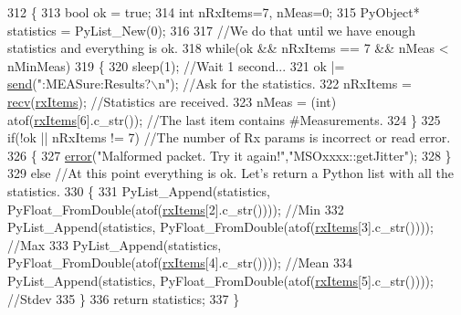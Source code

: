 \begin{DoxyCode}
312 \{   
313     \textcolor{keywordtype}{bool}            ok = \textcolor{keyword}{true};
314     \textcolor{keywordtype}{int}             nRxItems=7, nMeas=0;
315     PyObject* statistics = PyList\_New(0);
316 
317     \textcolor{comment}{//We do that until we have enough statistics and everything is ok.}
318     \textcolor{keywordflow}{while}(ok && nRxItems == 7 && nMeas < nMinMeas)
319     \{
320         sleep(1);                                                                   \textcolor{comment}{//Wait 1 second...}
321         ok |= \hyperlink{classMSOxxxx_ae77668a1ae4ccb74e0ed5f2485dfdebf}{send}(\textcolor{stringliteral}{":MEASure:Results?\(\backslash\)n"});              \textcolor{comment}{//Ask for the statistics.}
322         nRxItems = \hyperlink{classMSOxxxx_aa02e46a61e287ef1f5377e9e42399faf}{recv}(\hyperlink{classMSOxxxx_a847cae37181e9ec5f481edcc3fb19b1a}{rxItems});                                    \textcolor{comment}{//Statistics are received.}
323         nMeas = (int) atof(\hyperlink{classMSOxxxx_a847cae37181e9ec5f481edcc3fb19b1a}{rxItems}[6].c\_str());      \textcolor{comment}{//The last item contains #Measurements.}
324     \}
325     \textcolor{keywordflow}{if}(!ok || nRxItems != 7)                                        \textcolor{comment}{//The number of Rx params is incorrect
       or read error.}
326     \{
327         \hyperlink{classObject_a204a95f57818c0f811933917a30eff45}{error}(\textcolor{stringliteral}{"Malformed packet. Try it again!"},\textcolor{stringliteral}{"MSOxxxx::getJitter"});
328     \}
329     \textcolor{keywordflow}{else}            \textcolor{comment}{//At this point everything is ok. Let's return a Python list with all the statistics.}
330     \{
331         PyList\_Append(statistics, PyFloat\_FromDouble(atof(\hyperlink{classMSOxxxx_a847cae37181e9ec5f481edcc3fb19b1a}{rxItems}[2].c\_str())));     \textcolor{comment}{//Min}
332         PyList\_Append(statistics, PyFloat\_FromDouble(atof(\hyperlink{classMSOxxxx_a847cae37181e9ec5f481edcc3fb19b1a}{rxItems}[3].c\_str())));     \textcolor{comment}{//Max}
333         PyList\_Append(statistics, PyFloat\_FromDouble(atof(\hyperlink{classMSOxxxx_a847cae37181e9ec5f481edcc3fb19b1a}{rxItems}[4].c\_str())));     \textcolor{comment}{//Mean}
334         PyList\_Append(statistics, PyFloat\_FromDouble(atof(\hyperlink{classMSOxxxx_a847cae37181e9ec5f481edcc3fb19b1a}{rxItems}[5].c\_str())));     \textcolor{comment}{//Stdev}
335     \}
336     \textcolor{keywordflow}{return} statistics;
337 \}
\end{DoxyCode}
\mbox{\label{classMSOxxxx_a9723e9234403d5eb74bde628fd78d56c}} 
